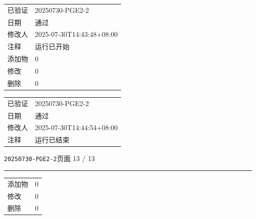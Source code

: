 \documentclass[UTF8,10pt,a4paper,fontset=fandol]{ctexart}
\newcommand{\fieldvalue}[1]{#1}
\begin{document}
\begin{center}
\begin{center}
\begin{tabular}{@{}ll@{}}
已验证 &
\fieldvalue{20250730-PGE2-2}\\
日期 &
\fieldvalue{通过}\\
修改人 &
\fieldvalue{2025-07-30T14:43:48+08:00}\\
注释 &
\fieldvalue{运行已开始}\\
添加物 &
\fieldvalue{0}\\
修改 &
\fieldvalue{0}\\
删除 &
\fieldvalue{0}\\
\end{tabular}

\medskip


\begin{tabular}{@{}ll@{}}
已验证 &
\fieldvalue{20250730-PGE2-2}\\
日期 &
\fieldvalue{通过}\\
修改人 &
\fieldvalue{2025-07-30T14:44:54+08:00}\\
注释 &
\fieldvalue{运行已结束}\\
\end{tabular}

\newpage

\noindent\texttt{20250730-PGE2-2}\hfill 页面 13 / 13

\vspace{0.3em}
\hrule
\vspace{1em}

\begin{tabular}{@{}ll@{}}
添加物 &
\fieldvalue{0}
\\
修改 &
\fieldvalue{0}
\\
删除 &
\fieldvalue{0}
\end{tabular}


\end{center}
\end{center}
\end{document}
